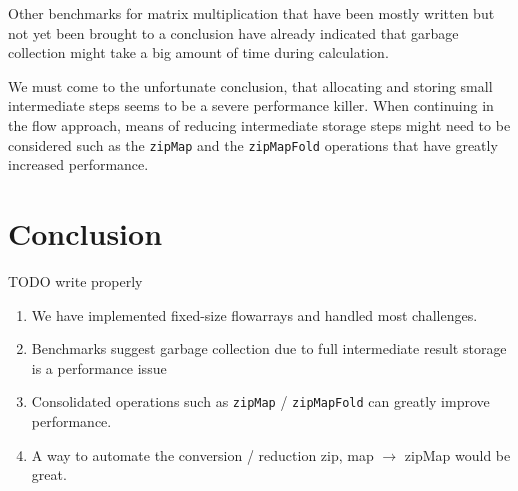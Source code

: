 \documentclass[runningheads,a4paper,fleqn]{llncs}
\begin{document}
Other benchmarks for matrix multiplication that have been mostly
written but not yet been brought to a conclusion have already
indicated that garbage collection might take a big amount of time
during calculation.

We must come to the unfortunate conclusion, that allocating and
storing small intermediate steps seems to be a severe performance
killer. When continuing in the flow approach, means of reducing
intermediate storage steps might need to be considered such as the
\texttt{zipMap} and the \texttt{zipMapFold} operations that have
greatly increased performance.

\section{Conclusion}
\label{sec:conclusion}
TODO write properly
\begin{enumerate}
\item We have implemented fixed-size flowarrays and handled most
  challenges.
\item Benchmarks suggest garbage collection due to full intermediate
  result storage is a performance issue
\item Consolidated operations such as \texttt{zipMap} /
  \texttt{zipMapFold} can greatly improve performance.
\item A way to automate the conversion / reduction zip, map $\to$
  zipMap would be great.
\end{enumerate}



\end{document}
